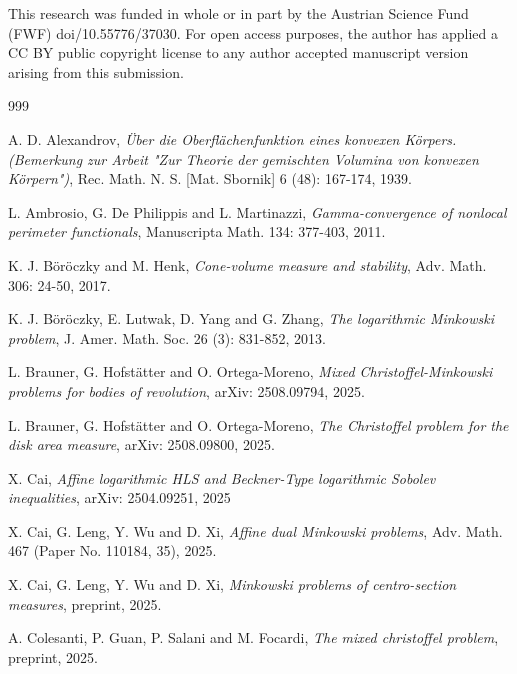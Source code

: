 \documentclass[12pt, oneside,reqno]{amsart}
\numberwithin{equation}{section}
\newtheorem{definition and theorem}[theorem]{Definition and Theorem}
\theoremstyle{plain}
\theoremstyle{remark}
\theoremstyle{definition}
\begin{document}
This research was funded in whole or in part by the Austrian Science Fund (FWF) doi/10.55776/37030. For open access purposes, the author has applied a CC BY public copyright license to any author accepted manuscript version arising from this submission.




\begin{thebibliography}{999}

A. D. Alexandrov, 
\emph{Über die Oberflächenfunktion eines konvexen Körpers. (Bemerkung zur Arbeit "Zur Theorie der gemischten Volumina von konvexen Körpern")}, 
Rec. Math. N. S. [Mat. Sbornik] 6 (48): 167-174, 1939.

L. Ambrosio, G. De Philippis and L. Martinazzi,
\emph{Gamma-convergence of nonlocal perimeter functionals}, Manuscripta Math. 134: 377-403, 2011.



K. J. B\"or\"oczky and M. Henk,
\emph{Cone-volume measure and stability},
Adv. Math. 306: 24-50, 2017.

K. J. B\"or\"oczky, E. Lutwak, D. Yang and G. Zhang,
\emph{The logarithmic Minkowski problem},
J. Amer. Math. Soc. 26 (3): 831-852, 2013.

L. Brauner, G. Hofstätter and O. Ortega-Moreno,
\emph{Mixed Christoffel-Minkowski problems for bodies of revolution},
arXiv: 2508.09794, 2025.


L. Brauner, G. Hofstätter and O. Ortega-Moreno,
\emph{The Christoffel problem for the disk area measure},
arXiv: 2508.09800, 2025.

X. Cai,
\emph{Affine logarithmic HLS and Beckner-Type logarithmic Sobolev inequalities},
arXiv: 2504.09251, 2025

X. Cai, G. Leng, Y. Wu and D. Xi,
\emph{Affine dual Minkowski problems},
Adv. Math. 467 (Paper No. 110184, 35), 2025.

X. Cai, G. Leng, Y. Wu and D. Xi,
\emph{Minkowski problems of centro-section measures},
preprint, 2025.



A. Colesanti, P. Guan, P. Salani and M. Focardi,
\emph{The mixed christoffel problem},
preprint, 2025.


\end{thebibliography}
\end{document}
